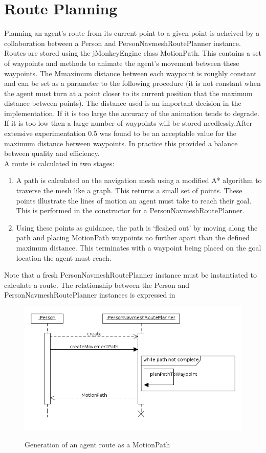 %
\section{Route Planning}
Planning an agent's route from its current point to a given point is acheived by a collaboration between a Person and PersonNavmeshRoutePlanner instance. Routes are stored using the jMonkeyEngine class MotionPath. This contains a set of waypoints and methods to animate the agent's movement between these waypoints. The Mmaximum distance between each waypoint is roughly constant and can be set as a parameter to the following procedure (it is not constant when the agent must turn at a point closer to its current position that the maximum distance between points). The distance used is an important decision in the implementation. If it is too large the accuracy of the animation tends to degrade. If it is too low then a large number of waypoints will be stored needlessly.After extensive experimentation 0.5 was found to be an acceptable value for the maximum distance between waypoints. In practice this provided a balance between quality and efficiency.\\
A route is calculated in two stages:
\begin{enumerate}
\item{A path is calculated on the navigation mesh using a modified A* algorithm to traverse the mesh like a graph. This returns a small set of points. These points illustrate the lines of motion an agent must take to reach their goal. This is performed in the constructor for a PersonNavmeshRoutePlanner.}
\item{Using these points as guidance, the path is `fleshed out' by moving along the path and placing MotionPath waypoints no further apart than the defined maximum
distance. This terminates with a waypoint being placed on the goal location the agent must reach.}
\end{enumerate}
Note that a fresh PersonNavmeshRoutePlanner instance must be instantiated to calculate a route. The relationship between the Person and PersonNavmeshRoutePlanner instances is expressed in 

\begin{figure}
\centering
\includegraphics[scale=0.5]{../UMLDiagrams/RoutePlanningSequence.png}
\label{fig:RoutePlanSequence}
\caption{Generation of an agent route as a MotionPath}
\end{figure}


